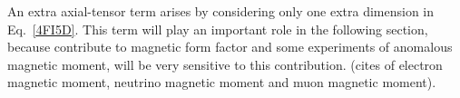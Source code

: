 An extra axial-tensor term arises by considering only one extra dimension in Eq.~\eqref{4FI5D}. This term will play an important role in the following section, because contribute to magnetic form factor and some experiments of anomalous magnetic moment, will be very sensitive to this contribution. (cites of electron magnetic moment, neutrino magnetic moment and muon magnetic moment).


